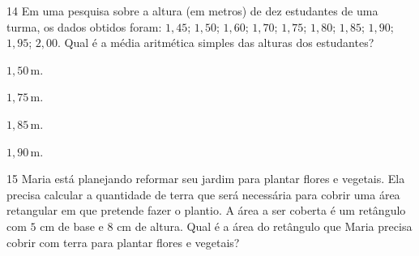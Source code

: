 \num{14} Em uma pesquisa sobre a altura (em metros) de dez estudantes de uma turma, os
dados obtidos foram: $1,45$; $1,50$; $1,60$; $1,70$; $1,75$; $1,80$;
$1,85$; $1,90$; $1,95$; $2,00$. Qual é a média aritmética simples das
alturas dos estudantes?

\begin{escolha}
\item $1,50\,\text{m}$.
\item $1,75\,\text{m}$.
\item $1,85\,\text{m}$.
\item $1,90\,\text{m}$.
\end{escolha}



\num{15} Maria está planejando reformar seu jardim para plantar flores e vegetais.
Ela precisa calcular a quantidade de terra que será necessária para cobrir uma área
retangular em que pretende fazer o plantio. A área a ser coberta é um retângulo com
$5$ cm de base e $8$ cm de altura. Qual é a área do retângulo que Maria precisa cobrir
com terra para plantar flores e vegetais?

